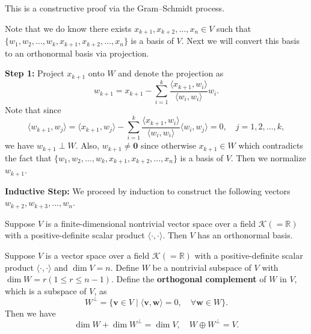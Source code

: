 	\begin{proofenv}
		This is a constructive proof via the Gram–Schmidt process. 

		Note that we do know there exists $x_{k+1}, x_{k+2}, \ldots, x_n \in V$ such that $\{w_1, w_2, \ldots, w_k, x_{k+1}, x_{k+2}, \ldots, x_n\}$ is a basis of $V$. Next we will convert this basis to an orthonormal basis via projection.

		\textbf{Step 1:} Project $x_{k+1}$ onto $W$ and denote the projection as
		\[
		w_{k+1} = x_{k+1} - \sum_{i=1}^k \frac{\langle x_{k+1}, w_i \rangle}{\langle w_i, w_i \rangle} w_i.
		\]
		Note that since
		\[
		\langle w_{k+1}, w_j \rangle = \langle x_{k+1}, w_j \rangle - \sum_{i=1}^k \frac{\langle x_{k+1}, w_i \rangle}{\langle w_i, w_i \rangle} \langle w_i, w_j \rangle = 0, \quad j=1,2,\ldots,k,
		\]
		we have $w_{k+1} \perp W$. Also, $w_{k+1} \neq \bm{0}$ since otherwise $x_{k+1} \in W$ which contradicts the fact that $\{w_1, w_2, \ldots, w_k, x_{k+1}, x_{k+2}, \ldots, x_n\}$ is a basis of $V$. Then we normalize $w_{k+1}$.

		\textbf{Inductive Step:} We proceed by induction to construct the following vectors $w_{k+2}, w_{k+3}, \ldots, w_n$.

	\end{proofenv}
	\begin{theoremenv}
		Suppose $V$ is a finite-dimensional nontrivial vector space over a field $\mathcal{K}\left( = \mathbb{R} \right)$ with a positive-definite scalar product $\langle \cdot, \cdot \rangle$. Then $V$ has an orthonormal basis.
	\end{theoremenv}
	\begin{theoremenv}
		Suppose $V$ is a vector space over a field $\mathcal{K}\left( = \mathbb{R} \right)$ with a positive-definite scalar product $\langle \cdot, \cdot \rangle$ and $\dim V = n$. Define $W$ be a nontrivial subspace of $V$ with $\dim W = r \left( 1\le r \le n-1 \right) $. Define the \textbf{orthogonal complement} of $W$ in $V$, which is a subspace of $V$, as
		\[
		W^\perp = \{ \bm{v} \in V \mid \langle \bm{v}, \bm{w} \rangle = 0, \quad \forall \bm{w} \in W \}.
		\]
		Then we have
		\[
		\dim W + \dim W^\perp = \dim V, \quad W \oplus W^\perp = V.
		\]
	\end{theoremenv}
